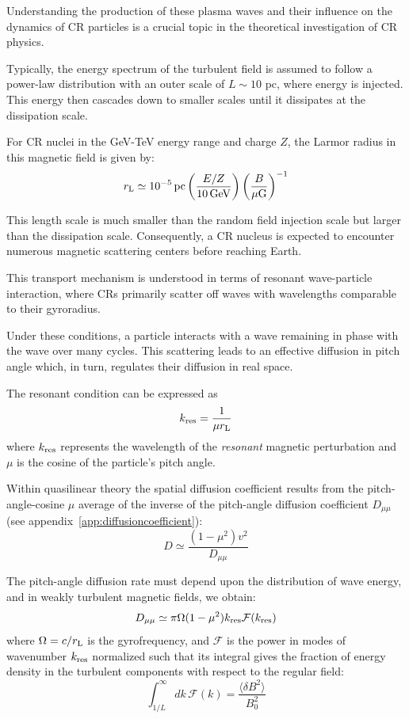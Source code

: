 Understanding the production of these plasma waves and their influence on the dynamics of CR particles is a crucial topic in the theoretical investigation of CR physics.

Typically, the energy spectrum of the turbulent field is assumed to follow a power-law distribution with an outer scale of $L \sim 10$ pc, where energy is injected. This energy then cascades down to smaller scales until it dissipates at the dissipation scale.

For CR nuclei in the GeV-TeV energy range and charge $Z$, the Larmor radius in this magnetic field is given by:
%
\begin{equation}
r_{\rm L} \simeq 10^{-5} \, \text{pc} \left( \frac{E / Z}{10 \, \text{GeV}} \right) \left( \frac{B}{\mu\text{G}}\right)^{-1}  
\end{equation}

This length scale is much smaller than the random field injection scale but larger than the dissipation scale. Consequently, a CR nucleus is expected to encounter numerous magnetic scattering centers before reaching Earth.

This transport mechanism is understood in terms of resonant wave-particle interaction, where CRs primarily scatter off waves with wavelengths comparable to their gyroradius. 

Under these conditions, a particle interacts with a wave remaining in phase with the wave over many cycles. 
%
This scattering leads to an effective diffusion in pitch angle which, in turn, regulates their diffusion in real space.

The resonant condition can be expressed as
%
\begin{equation}
k_{\rm res} = \frac{1}{\mu r_{\rm L}}
\end{equation}
%
where $k_{\rm res}$ represents the wavelength of the \emph{resonant} magnetic perturbation and $\mu$ is the cosine of the particle's pitch angle.

Within quasilinear theory the spatial diffusion coefficient results from the pitch-angle-cosine $\mu$ average of the inverse of the pitch-angle diffusion coefficient $D_{\mu\mu}$ (see appendix~\ref{app:diffusioncoefficient}):
%
\begin{equation}
D \simeq \frac{(1-\mu^2) v^2}{D_{\mu\mu}}
\label{eq:dandbasta}
\end{equation}

The pitch-angle diffusion rate must depend upon the distribution of wave energy, and in weakly turbulent magnetic fields, we obtain:
%
\begin{equation}
D_{\mu\mu} \simeq \pi \Omega (1-\mu^2) k_{\rm res} \mathcal F(k_{\rm res})
\label{eq:dmumusimeq}
\end{equation}
%
where $\Omega = c / r_{\rm L}$ is the gyrofrequency, and $\mathcal F$ is the power in modes of wavenumber $k_{\rm res}$ normalized such that its integral gives the fraction of energy density in the turbulent components with respect to the regular field:
%
\begin{equation}
\int_{1/L}^\infty \! dk \, \mathcal F(k) = \frac{\langle \delta B^2 \rangle}{B_0^2}
\end{equation}


